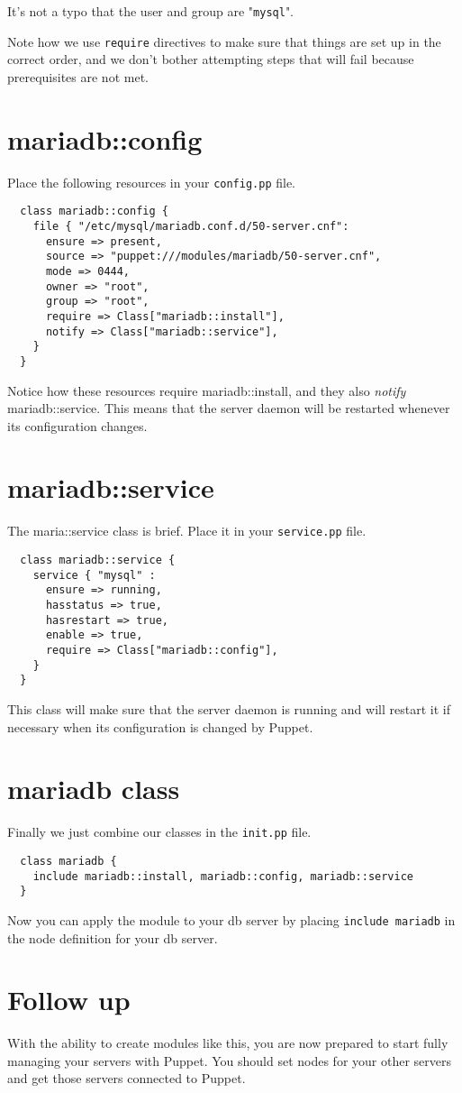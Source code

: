 \documentclass{article}   	%
\begin{document}
It's not a typo that the user and group are "\texttt{mysql}".

Note how we use \texttt{require} directives to make sure that things are set up in the correct order, and we don't bother attempting steps that will fail because prerequisites are not met.



\newpage

\section{mariadb::config}
Place the following resources in your \texttt{config.pp} file.

\begin{verbatim}
  class mariadb::config {
    file { "/etc/mysql/mariadb.conf.d/50-server.cnf":
      ensure => present,
      source => "puppet:///modules/mariadb/50-server.cnf",
      mode => 0444,
      owner => "root",
      group => "root",
      require => Class["mariadb::install"],
      notify => Class["mariadb::service"],
    }
  }
\end{verbatim}

Notice how these resources require mariadb::install, and they also \emph{notify} mariadb::service.  This means that the server daemon will be restarted whenever its configuration changes.

\section{mariadb::service}
The maria::service class is brief.  Place it in your \texttt{service.pp} file.

\begin{verbatim}
  class mariadb::service {
    service { "mysql" :
      ensure => running,
      hasstatus => true,
      hasrestart => true,
      enable => true,
      require => Class["mariadb::config"],
    }
  }
\end{verbatim}

This class will make sure that the server daemon is running and will restart it if necessary when its configuration is changed by Puppet.

\section{mariadb class}

Finally we just combine our classes in the \texttt{init.pp} file.

\begin{verbatim}
  class mariadb {
    include mariadb::install, mariadb::config, mariadb::service
  }
\end{verbatim}

Now you can apply the module to your db server by placing \texttt{include mariadb} in the node definition for your db server.

\section{Follow up}
With the ability to create modules like this, you are now prepared to start fully managing your servers with Puppet.  You should set nodes for your other servers and get those servers connected to Puppet.
 
\end{document}
